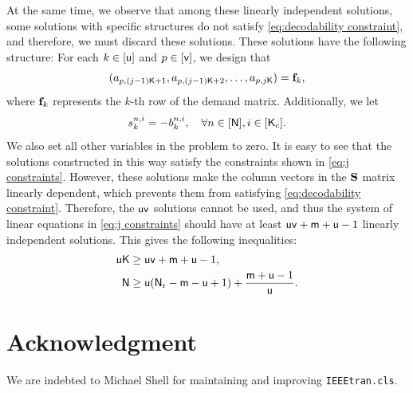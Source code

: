 \documentclass[conference,letterpaper]{IEEEtran}
\begin{document}
At the same time, we observe that among these linearly independent solutions, some solutions with specific structures do not satisfy \eqref{eq:decodability constraint}, and therefore, we must discard these solutions. These solutions have the following structure:
For each \( k \in [{\sf u}] \) and \( p \in [{\sf v}] \), we design that
\[
(a_{p, (j-1){\sf K} + 1}, a_{p, (j-1){\sf K} + 2}, \ldots, a_{p, j{\sf K}}) = {\bf f}_k,
\]
where \( {\bf f}_k \) represents the \( k \)-th row of the demand matrix. Additionally, we let
\[
s^{n,i}_k = -b^{n,i}_k, \quad \forall n \in [{\sf N}], i \in [{\sf K}_{\rm c}].
\]
We also set all other variables in the problem to zero.
It is easy to see that the solutions constructed in this way satisfy the constraints shown in \eqref{eq:j constraints}. However, these solutions make the column vectors in the \( {\bf S} \) matrix linearly dependent, which prevents them from satisfying \eqref{eq:decodability constraint}. Therefore, the \( {\sf u} {\sf v} \) solutions cannot be used, and thus the system of linear equations in \eqref{eq:j constraints} should have at least \( {\sf u} {\sf v} + {\sf m} + {\sf u} - 1 \) linearly independent solutions. This gives the following inequalities:
\begin{align}
\begin{aligned}
{\sf u} {\sf K} &\geq {\sf u} {\sf v} + {\sf m} + {\sf u} - 1, \\
{\sf N} &\geq {\sf u} ({\sf N}_{\rm r} - {\sf m} - {\sf u} + 1) + \frac{{\sf m} + {\sf u} - 1}{{\sf u}}.
\end{aligned}
\end{align}


\section*{Acknowledgment}

We are indebted to Michael Shell for maintaining and improving
\texttt{IEEEtran.cls}. 




%
%




 
\clearpage
\end{document}
